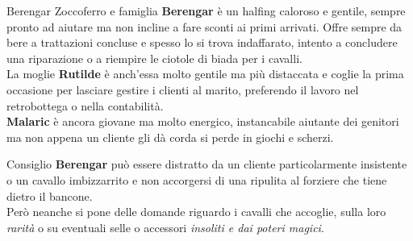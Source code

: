 \documentclass[10pt,twoside,onecolumn,openany]{book}
\begin{document}
\begin{multicols}{2}
\begin{paperbox}{{Berengar Zoccoferro e famiglia}}
	\textbf{Berengar} è un halfing caloroso e gentile, sempre pronto ad aiutare ma non incline a fare sconti ai primi arrivati. Offre sempre da bere a trattazioni concluse e spesso lo si trova indaffarato, intento a concludere una riparazione o a riempire le ciotole di biada per i cavalli.\\
	La moglie \textbf{Rutilde} è anch'essa molto gentile ma più distaccata e coglie la prima occasione per lasciare gestire i clienti al marito, preferendo il lavoro nel retrobottega o nella contabilità.\\
	\textbf{Malaric} è ancora giovane ma molto energico, instancabile aiutante dei genitori ma non appena un cliente gli dà corda si perde in giochi e scherzi.\\
\end{paperbox}
\columnbreak
\begin{commentbox}{{Consiglio}}
\textbf{Berengar} può essere distratto da un cliente particolarmente insistente o un cavallo imbizzarrito e non accorgersi di una ripulita al forziere che tiene dietro il bancone.\\
Però neanche si pone delle domande riguardo i cavalli che accoglie, sulla loro \textit{rarità} o su eventuali selle o accessori \textit{insoliti e dai poteri magici}.\\
\end{commentbox}
\end{multicols}
\end{document}
